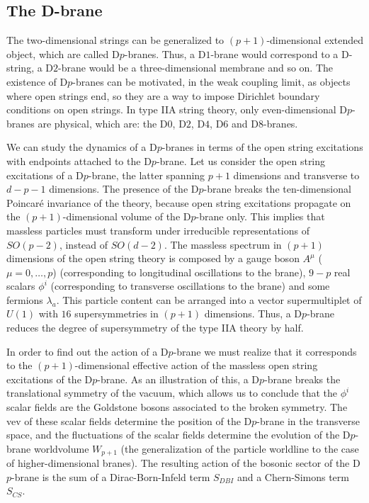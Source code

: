 \subsection{The D-brane}

The two-dimensional strings can be generalized to $(p+1)$-dimensional extended object, which are called D$p$-branes.
Thus, a D$1$-brane would correspond to a D-string, a D$2$-brane would be a three-dimensional membrane and so on.
The existence of D$p$-branes can be motivated, in the weak coupling limit, as 
objects where open strings end, so they are a way to impose Dirichlet boundary conditions on open strings.
In type IIA string theory, only even-dimensional D$p$-branes are physical, which are: the D$0$, D$2$, D$4$, D$6$ and D$8$-branes.

We can study the dynamics of a D$p$-branes in terms of the open string excitations  with endpoints
attached to the D$p$-brane.
Let us consider the open string excitations of a D$p$-brane, the latter spanning $p+1$ dimensions and transverse to $d-p-1$ dimensions.
The presence of the D$p$-brane breaks the ten-dimensional Poincaré invariance of the theory, because
open string excitations propagate on the $(p+1)$-dimensional volume of the D$p$-brane only.
This implies that massless particles must transform under irreducible representations of $SO(p-2)$, instead of
$SO(d-2)$.
The massless spectrum in $(p+1)$ dimensions of the open string theory is composed by a gauge boson $A^\mu$ ($\mu=0,\ldots,p$) (corresponding
to longitudinal oscillations to the brane),
$9-p$ real scalars $\phi^i$ (corresponding to transverse oscillations to the brane) and some fermions $\lambda_a$.
This particle content can be arranged into a vector supermultiplet of $U(1)$ with $16$ supersymmetries
in $(p+1)$ dimensions. 
Thus, a D$p$-brane reduces the degree of supersymmetry of the type IIA theory by half.

In order to find out the action of a D$p$-brane we must realize that it corresponds to the
$(p+1)$-dimensional effective action of the massless open string excitations of the D$p$-brane.
As an illustration of this, a D$p$-brane breaks the translational symmetry of the vacuum, which allows
us to conclude that the $\phi^i$ scalar fields are the Goldstone bosons associated to the broken symmetry. 
The vev of these scalar fields determine the position of the D$p$-brane in the transverse space, and the fluctuations of the scalar
fields determine the evolution of the D$p$-brane worldvolume $W_{p+1}$ (the generalization of the particle worldline to the case of higher-dimensional branes). 
The resulting action of the bosonic sector of the D$p$-brane is the sum of a Dirac-Born-Infeld term $S_{DBI}$ and a Chern-Simons term $S_{CS}$.

